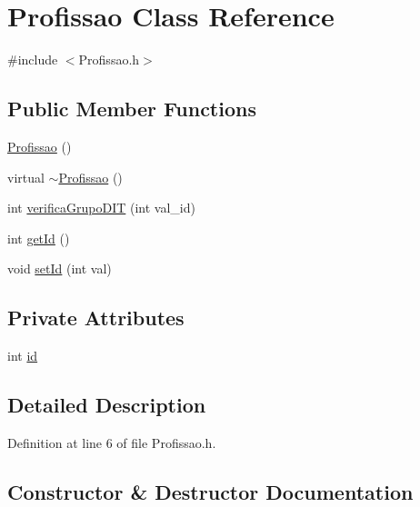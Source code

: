 \hypertarget{class_profissao}{}\section{Profissao Class Reference}
\label{class_profissao}


{\ttfamily \#include $<$Profissao.\+h$>$}

\subsection*{Public Member Functions}
\begin{DoxyCompactItemize}
\item 
\hyperlink{class_profissao_a7af71823014efda81af94ff224354efa}{Profissao} ()
\item 
virtual \hyperlink{class_profissao_ae1f1d15fd068634e67858000dcc3f0cb}{$\sim$\+Profissao} ()
\item 
int \hyperlink{class_profissao_abaf577d0e4c656c445d4c4aa9a4bd26f}{verifica\+Grupo\+D\+IT} (int val\+\_\+id)
\item 
int \hyperlink{class_profissao_a8055e0438df191270a56c9154c38d46d}{get\+Id} ()
\item 
void \hyperlink{class_profissao_a81cc70bce0cc3e6966745d07e2c58bc2}{set\+Id} (int val)
\end{DoxyCompactItemize}
\subsection*{Private Attributes}
\begin{DoxyCompactItemize}
\item 
int \hyperlink{class_profissao_a6f9d64a9e6ca4216ca4cd1cb28d8e5dd}{id}
\end{DoxyCompactItemize}


\subsection{Detailed Description}


Definition at line 6 of file Profissao.\+h.



\subsection{Constructor \& Destructor Documentation}
\hypertarget{class_profissao_a7af71823014efda81af94ff224354efa}{}\label{class_profissao_a7af71823014efda81af94ff224354efa} 
